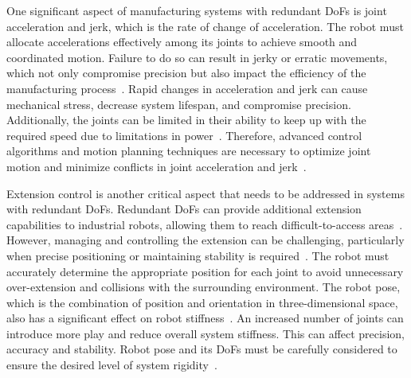 







One significant aspect of manufacturing systems with redundant \acrshort{DoF}s is joint acceleration and jerk, which is the rate of change of acceleration. The robot must allocate accelerations effectively among its joints to achieve smooth and coordinated motion. Failure to do so can result in jerky or erratic movements, which not only compromise precision but also impact the efficiency of the manufacturing process~\cite{Duong.2021}. Rapid changes in acceleration and jerk can cause mechanical stress, decrease system lifespan, and compromise precision. Additionally, the joints can be limited in their ability to keep up with the required speed due to limitations in power~\cite{Staff.1988}. Therefore, advanced control algorithms and motion planning techniques are necessary to optimize joint motion and minimize conflicts in joint acceleration and jerk~\cite{Duong.2021, Valente.2017}.

Extension control is another critical aspect that needs to be addressed in systems with redundant \acrshort{DoF}s. Redundant \acrshort{DoF}s can provide additional extension capabilities to industrial robots, allowing them to reach difficult-to-access areas~\cite{Duong.2021}. However, managing and controlling the extension can be challenging, particularly when precise positioning or maintaining stability is required~\cite{Lin.2022}.
The robot must accurately determine the appropriate position for each joint to avoid unnecessary over-extension and collisions with the surrounding environment. The robot pose, which is the combination of position and orientation in three-dimensional space, also has a significant effect on robot stiffness~\cite{Xiong.2019}. An increased number of joints can introduce more play and reduce overall system stiffness. This can affect precision, accuracy and stability. Robot pose and its \acrshort{DoF}s must be carefully considered to ensure the desired level of system rigidity~\cite{Wang.2022, Shi.2021}.


